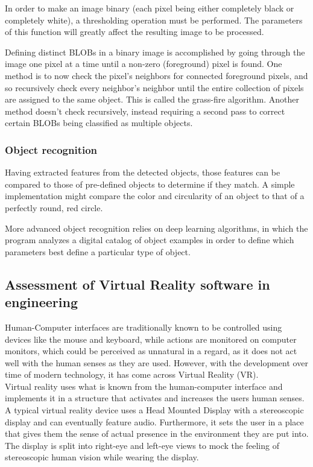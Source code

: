 			In order to make an image binary (each pixel being either completely black or completely white), a thresholding operation must be performed. The parameters of this function will greatly affect the resulting image to be processed. 
			
			Defining distinct BLOBs in a binary image is accomplished by going through the image one pixel at a time until a non-zero (foreground) pixel is found. One method is to now check the pixel's neighbors for connected foreground pixels, and so recursively check every neighbor's neighbor until the entire collection of pixels are assigned to the same object. This is called the grass-fire algorithm. Another method doesn't check recursively, instead requiring a second pass to correct certain BLOBs being classified as multiple objects.
			
			
			\subsubsection{Object recognition}
				Having extracted features from the detected objects, those features can be compared to those of pre-defined objects to determine if they match. A simple implementation might compare the color and circularity of an object to that of a perfectly round, red circle. 
				
				More advanced object recognition relies on deep learning algorithms, in which the program analyzes a digital catalog of object examples in order to define which parameters best define a particular type of object.
			

		\subsection{Assessment of Virtual Reality software in engineering}
		Human-Computer interfaces are traditionally known to be controlled using devices like the mouse and keyboard, while actions are monitored on computer monitors, which could be perceived as unnatural in a regard, as it does not act well with the human senses as they are used. However, with the development over time of modern technology, it has come across Virtual Reality (VR). \\
		
		Virtual reality uses what is known from the human-computer interface and implements it in a structure that activates and increases the users human senses. A typical virtual reality device uses a Head Mounted Display with a stereoscopic display and can eventually feature audio. Furthermore, it sets the user in a place that gives them the sense of actual presence in the environment they are put into. The display is split into right-eye and left-eye views to mock the feeling of stereoscopic human vision while wearing the display. 
		
